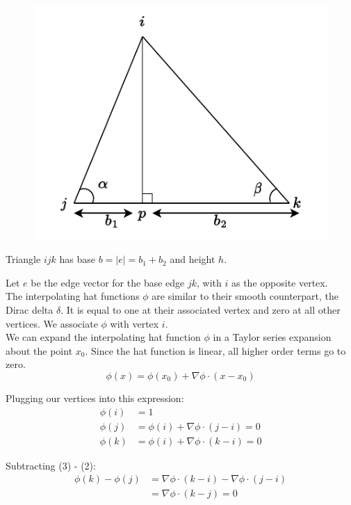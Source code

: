 \documentclass{article}
\def\grad{\nabla}
\begin{document}
\pagebreak
{}\\\\

\begin{figure}
    \includegraphics[scale=0.8]{figs/tri.pdf}
\end{figure}

Triangle $ijk$ has base $b = |e| = b_1 + b_2$ and height $h$.

Let $e$ be the edge vector for the base edge $jk$, with $i$ as the opposite vertex.\\

The interpolating hat functions $\phi$ are similar to their smooth counterpart, the Dirac delta $\delta$.
It is equal to one at their associated vertex and zero at all other vertices. We associate $\phi$ with vertex $i$.\\

We can expand the interpolating hat function $\phi$ in a Taylor series expansion about the point $x_0$. Since 
the hat function is linear, all higher order terms go to zero.\\
$$
    \phi(x) = \phi(x_0) + \grad \phi \cdot (x - x_0)
$$

Plugging our vertices into this expression:
\begin{align}
    \phi(i) &= 1 \\
    \phi(j) &= \phi(i) + \grad \phi \cdot (j - i) = 0 \\
    \phi(k) &= \phi(i) + \grad \phi \cdot (k - i) = 0
\end{align}

Subtracting (3) - (2):
\begin{align*}
    \phi(k) - \phi(j) &= \grad \phi \cdot (k - i) - \grad \phi \cdot (j - i)\\
        &= \grad \phi \cdot (k - j) = 0
\end{align*}
\end{document}
